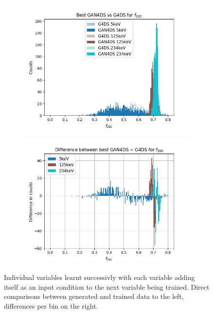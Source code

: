 \documentclass[11pt]{article} %
\begin{document}
\begin{figure}[H]
\begin{minipage}{\textwidth}
  \begin{subfigure}{.5\textwidth}
      \includegraphics[scale=0.5]{./images/best_f200like.png}
  \end{subfigure}
  \begin{subfigure}{.5\textwidth}
      \includegraphics[scale=0.5]{./images/difference_best_f200like.png}
  \end{subfigure}
\end{minipage}
\caption{Individual variables learnt successivly with each variable adding itself as an input condition
to the next variable being trained. Direct comparisons between generated and trained data to the left, differences per bin on the right.}
\label{fig:ind_results}
\end{figure}
\end{document}
